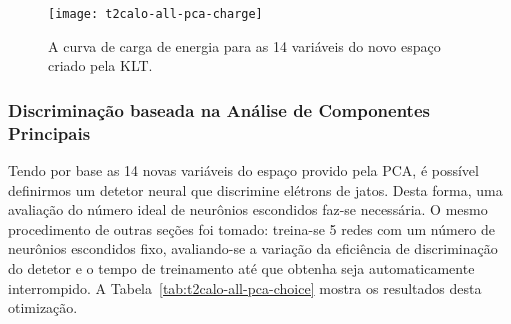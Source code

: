 \begin{figure}
\begin{center}
\texttt{[image: t2calo-all-pca-charge]}
\end{center}
\caption{A curva de carga de energia para as 14 variáveis do novo espaço
criado pela KLT.}
\label{fig:pca-charge}
\end{figure}

\subsubsection{Discriminação baseada na Análise de Componentes Principais}

Tendo por base as 14 novas variáveis do espaço provido pela PCA, é possível
definirmos um detetor neural que discrimine elétrons de jatos. Desta forma,
uma avaliação do número ideal de neurônios escondidos faz-se necessária. O
mesmo procedimento de outras seções foi tomado: treina-se 5 redes com um
número de neurônios escondidos fixo, avaliando-se a variação da eficiência de
discriminação do detetor e o tempo de treinamento até que obtenha seja
automaticamente interrompido. A Tabela~\ref{tab:t2calo-all-pca-choice} mostra
os resultados desta otimização.

